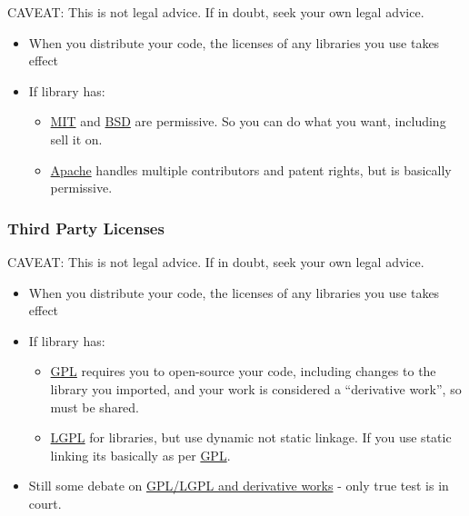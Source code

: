CAVEAT: This is not legal advice. If in doubt, seek your own legal
advice.

\begin{itemize}
\itemsep1pt\parskip0pt
\item
  When you distribute your code, the licenses of any libraries you use
  takes effect
\item
  If library has:

  \begin{itemize}
  \itemsep1pt\parskip0pt
  \item
    \href{http://opensource.org/licenses/MIT}{MIT} and
    \href{http://opensource.org/licenses/BSD-3-Clause}{BSD} are
    permissive. So you can do what you want, including sell it on.
  \item
    \href{http://opensource.org/licenses/Apache-2.0}{Apache} handles
    multiple contributors and patent rights, but is basically
    permissive.
  \end{itemize}
\end{itemize}

\subsubsection{Third Party Licenses}\label{third-party-licenses-1}

CAVEAT: This is not legal advice. If in doubt, seek your own legal
advice.

\begin{itemize}
\itemsep1pt\parskip0pt
\item
  When you distribute your code, the licenses of any libraries you use
  takes effect
\item
  If library has:

  \begin{itemize}
  \itemsep1pt\parskip0pt
  \item
    \href{http://opensource.org/licenses/gpl-license}{GPL} requires you
    to open-source your code, including changes to the library you
    imported, and your work is considered a ``derivative work'', so must
    be shared.
  \item
    \href{http://opensource.org/licenses/lgpl-license}{LGPL} for
    libraries, but use dynamic not static linkage. If you use static
    linking its basically as per
    \href{http://opensource.org/licenses/gpl-license}{GPL}.
  \end{itemize}
\item
  Still some debate on \href{https://lwn.net/Articles/548216/}{GPL/LGPL
  and derivative works} - only true test is in court.
\end{itemize}

